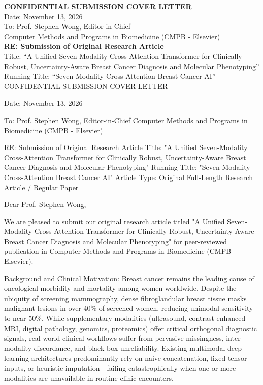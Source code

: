 \documentclass[11pt]{article}
\begin{document}
\noindent\textbf{CONFIDENTIAL SUBMISSION COVER LETTER}\\
\noindent Date: November 13, 2026\\
\noindent To: Prof. Stephen Wong, Editor-in-Chief\\
\noindent Computer Methods and Programs in Biomedicine (CMPB - Elsevier)\\
\vspace{0.5cm}
\noindent\textbf{RE: Submission of Original Research Article}\\
\noindent Title: ``A Unified Seven-Modality Cross-Attention Transformer for Clinically Robust, Uncertainty-Aware Breast Cancer Diagnosis and Molecular Phenotyping''\\
\noindent Running Title: ``Seven-Modality Cross-Attention Breast Cancer AI''\\
\vspace{0.5cm}
CONFIDENTIAL SUBMISSION COVER LETTER

Date: November 13, 2026

To:
Prof. Stephen Wong, Editor-in-Chief
Computer Methods and Programs in Biomedicine (CMPB - Elsevier)

RE: Submission of Original Research Article
Title: "A Unified Seven-Modality Cross-Attention Transformer for Clinically Robust, Uncertainty-Aware Breast Cancer Diagnosis and Molecular Phenotyping"
Running Title: "Seven-Modality Cross-Attention Breast Cancer AI"
Article Type: Original Full-Length Research Article / Regular Paper

Dear Prof. Stephen Wong,

We are pleased to submit our original research article titled "A Unified Seven-Modality Cross-Attention Transformer for Clinically Robust, Uncertainty-Aware Breast Cancer Diagnosis and Molecular Phenotyping" for peer-reviewed publication in Computer Methods and Programs in Biomedicine (CMPB - Elsevier).

Background and Clinical Motivation:
Breast cancer remains the leading cause of oncological morbidity and mortality among women worldwide. Despite the ubiquity of screening mammography, dense fibroglandular breast tissue masks malignant lesions in over 40\% of screened women, reducing unimodal sensitivity to near 50\%. While supplementary modalities (ultrasound, contrast-enhanced MRI, digital pathology, genomics, proteomics) offer critical orthogonal diagnostic signals, real-world clinical workflows suffer from pervasive missingness, inter-modality discordance, and black-box unreliability. Existing multimodal deep learning architectures predominantly rely on naive concatenation, fixed tensor inputs, or heuristic imputation—failing catastrophically when one or more modalities are unavailable in routine clinic encounters.
\end{document}
